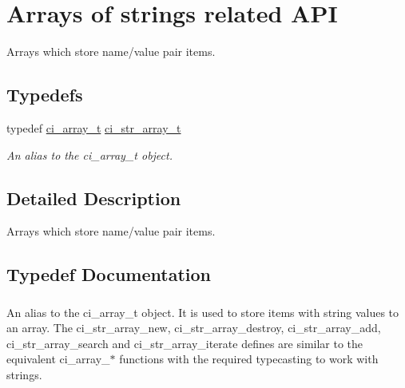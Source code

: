 \hypertarget{group__STR__ARRAYS}{
\section{Arrays of strings related API}
\label{group__STR__ARRAYS}
}


Arrays which store name/value pair items.  
\subsection*{Typedefs}
\begin{DoxyCompactItemize}
\item 
typedef \hyperlink{group__SIMPLE__ARRAYS_ga1bec5de79ca98bb53c039a8f8e959137}{ci\_\-array\_\-t} \hyperlink{group__STR__ARRAYS_gaaf0017685cb4013ce0c00d182f3df0c8}{ci\_\-str\_\-array\_\-t}
\begin{DoxyCompactList}\small\item\em An alias to the ci\_\-array\_\-t object. \item\end{DoxyCompactList}\end{DoxyCompactItemize}


\subsection{Detailed Description}
Arrays which store name/value pair items. 

\subsection{Typedef Documentation}
\hypertarget{group__STR__ARRAYS_gaaf0017685cb4013ce0c00d182f3df0c8}{
\subsubsection[{ci\_\-str\_\-array\_\-t}]{}}
\label{group__STR__ARRAYS_gaaf0017685cb4013ce0c00d182f3df0c8}


An alias to the ci\_\-array\_\-t object. It is used to store items with string values to an array. The ci\_\-str\_\-array\_\-new, ci\_\-str\_\-array\_\-destroy, ci\_\-str\_\-array\_\-add, ci\_\-str\_\-array\_\-search and ci\_\-str\_\-array\_\-iterate defines are similar to the equivalent ci\_\-array\_\-$\ast$ functions with the required typecasting to work with strings. 